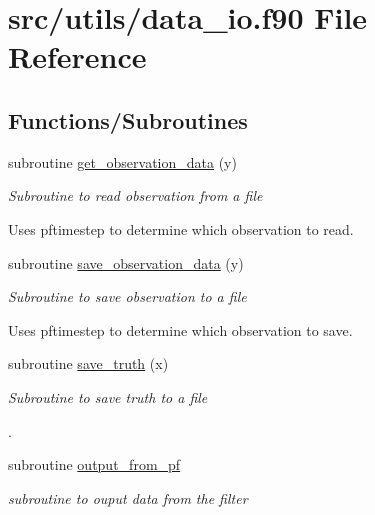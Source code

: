 \hypertarget{data__io_8f90}{\section{src/utils/data\-\_\-io.f90 File Reference}
\label{data__io_8f90}
}
\subsection*{Functions/\-Subroutines}
\begin{DoxyCompactItemize}
\item 
subroutine \hyperlink{data__io_8f90_a6dc5d8aea89b34a0942dfa6e4cc000ab}{get\-\_\-observation\-\_\-data} (y)
\begin{DoxyCompactList}\small\item\em Subroutine to read observation from a file \par
 Uses pftimestep to determine which observation to read. \end{DoxyCompactList}\item 
subroutine \hyperlink{data__io_8f90_a72594989fbfcfa6ed0b9935d48d73ba0}{save\-\_\-observation\-\_\-data} (y)
\begin{DoxyCompactList}\small\item\em Subroutine to save observation to a file \par
 Uses pftimestep to determine which observation to save. \end{DoxyCompactList}\item 
subroutine \hyperlink{data__io_8f90_a4a1af9be00771c4b74e182dd43bb0211}{save\-\_\-truth} (x)
\begin{DoxyCompactList}\small\item\em Subroutine to save truth to a file \par
. \end{DoxyCompactList}\item 
subroutine \hyperlink{data__io_8f90_a4b7f0fc2733276e4b8b074f089c7b4fb}{output\-\_\-from\-\_\-pf}
\begin{DoxyCompactList}\small\item\em subroutine to ouput data from the filter \end{DoxyCompactList}\end{DoxyCompactItemize}


